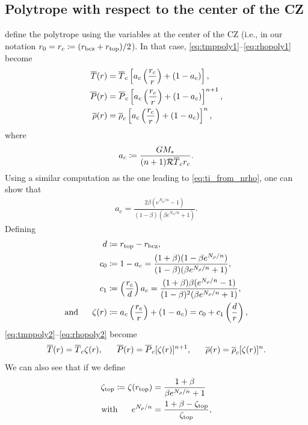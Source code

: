 \documentclass[12pt]{article}
\begin{document}
\subsection{Polytrope with respect to the center of the CZ}
\citet{Jones2011} define the polytrope using the variables at the center of the CZ (i.e., in our notation $r_0=r_c\coloneqq(r_{\rm{bcz}}+r_{\rm{top}})/2$). In that case, \eqref{eq:tmppoly1}--\eqref{eq:rhopoly1} become
\begin{align}
	\overline{T}(r) &= \overline{T}_c\left[a_c\left(\frac{r_c}{r}\right) + (1 - a_c)\right],\label{eq:tmppoly2}\\
	\overline{P}(r) &= \overline{P}_c\left[a_c\left(\frac{r_c}{r}\right) + (1 - a_c)\right]^{n+1},\label{eq:ppoly2}\\
	\overline{\rho}(r) &= \overline{\rho}_c\left[a_c\left(\frac{r_c}{r}\right) + (1 - a_c)\right]^n,\label{eq:rhopoly2}
\end{align} 
where 
\begin{align}
a_c \coloneqq \frac{GM_*}{(n+1)\mathcal{R} \overline{T}_c r_c}.
\label{eq:ac}
\end{align}
Using a similar computation as the one leading to \eqref{eq:ti_from_nrho}, one can show that 
\begin{align}
a_c = \frac{2\beta(e^{N_\rho/n}-1)}{(1-\beta)(\beta e^{N_\rho/n} + 1)}.
\label{eq:ac_fromn}
\end{align}
Defining 
\begin{align}
d&\coloneqq r_{\rm{top}}-r_{\rm{bcz}},\label{eq:d}\\
c_0&\coloneqq 1-a_c = \frac{(1+\beta)(1-\beta e^{N_\rho/n})}{(1-\beta)(\beta e^{N_\rho/n} + 1)}, \label{eq:c0}\\
c_1&\coloneqq \left(\frac{r_c}{d}\right)a_c = \frac{(1+\beta)\beta(e^{N_\rho/n}-1)}{(1-\beta)^2(\beta e^{N_\rho/n} + 1)},\label{eq:c1}\\
\text{and}\ \ \ \ \  \zeta(r) &\coloneqq a_c\left(\frac{r_c}{r}\right) + (1-a_c) = c_0 + c_1\left(\frac{d}{r}\right),\label{eq:zeta}
\end{align}
\eqref{eq:tmppoly2}--\eqref{eq:rhopoly2} become
\begin{align}
\tmpref\ofr=\tmpref_c\zeta(r),\ \ \ \ \ \prsref\ofr=\prsref_c[\zeta(r)]^{n+1},\ \ \ \ \ \rhoref\ofr=\rhoref_c[\zeta(r)]^n. 
\label{eq:polytrope3}
\end{align}
We can also see that if we define
\begin{subequations}
\begin{align}
\zeta_{\rm{top}} \coloneqq \zeta(r_{\rm{top}}) &= \frac{1+\beta}{\beta e^{N_\rho/n} + 1}\\
\text{with}\ \ \ \ \  e^{N_\rho/n}&=\frac{1+\beta-\zeta_{\rm{top}}}{\zeta_{\rm{top}}},
\end{align}
\end{subequations}
\end{document}
